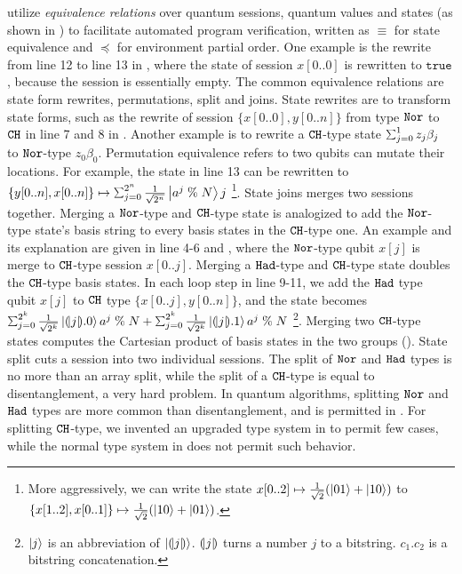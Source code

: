 \qafny utilize \emph{equivalence relations} over quantum sessions, quantum values and states (as shown in ) to facilitate automated program verification, written as $\equiv$ for state equivalence and $\preceq$ for environment partial order. One example is the rewrite from line 12 to line 13 in , where the state of session $x[0..0]$ is rewritten to $\texttt{true}$, because the session is essentially empty.
The common equivalence relations are state form rewrites, permutations, split and joins. 
State rewrites are to transform state forms, such as the rewrite of session $\{x[0..0],y[0..n]\}$ from type $\texttt{Nor}$ to $\texttt{CH}$ in line 7 and 8 in . Another example is to rewrite a $\texttt{CH}$-type state $\ssum{j=0}{1}{z_j\beta_j}$ to $\texttt{Nor}$-type ${z_0\beta_0}$. Permutation equivalence refers to two qubits can mutate their locations. For example, the state in line 13 can be rewritten to $\{y[0..n],x[0..n]\} \mapsto \scha{2^{n}}{\frac{1}{\sqrt{2^{n}}}}{a^{j}\;\%\;N}{j}$ \footnote{More aggressively, we can write the state $x[0..2]\mapsto \frac{1}{\sqrt{2}}(\left\vert{01}\right\rangle+\left\vert{10}\right\rangle)$ to $\{x[1..2],x[0..1]\}\mapsto \frac{1}{\sqrt{2}}(\left\vert{10}\right\rangle+\left\vert{01}\right\rangle)$.}.
State joins merges two sessions together. Merging a $\texttt{Nor}$-type and $\texttt{CH}$-type state is analogized to add the $\texttt{Nor}$-type state's basis string to every basis states in the $\texttt{CH}$-type one. An example and its explanation are given in 
 line 4-6 and , 
where the $\texttt{Nor}$-type qubit $x[j]$ is merge to $\texttt{CH}$-type session $x[0..j]$.
Merging a $\texttt{Had}$-type and $\texttt{CH}$-type state doubles the $\texttt{CH}$-type basis states. 
In each loop step in  line 9-11, we add the $\texttt{Had}$ type qubit $x[j]$ to $\texttt{CH}$ type $\{x[0..j],y[0..n]\}$, and the state becomes $\scha{2^k}{\frac{1}{\sqrt{2^k}}}{\tos{j}.0}{a^{j}\;\%\;N}+\scha{2^k}{\frac{1}{\sqrt{2^k}}}{\tos{j}.1}{a^{j}\;\%\;N}$ \footnote{$\left\vert{j}\right\rangle$ is an abbreviation of $\left\vert{(\!| j |\!)}\right\rangle$. $(\!| j |\!)$ turns a number $j$ to a bitstring. $c_1.c_2$ is a bitstring concatenation. }.
Merging two $\texttt{CH}$-type states computes the Cartesian product of basis states in the two groups ().
State split cuts a session into two individual sessions. The split of $\texttt{Nor}$ and $\texttt{Had}$ types is no more than an array split, while the split of a $\texttt{CH}$-type is equal to disentanglement, a very hard problem. In quantum algorithms, splitting $\texttt{Nor}$ and $\texttt{Had}$ types are more common than disentanglement, and is permitted in \qafny. For splitting $\texttt{CH}$-type, we invented an upgraded type system in  to permit few cases, while the normal \qafny type system in  does not permit such behavior. 

